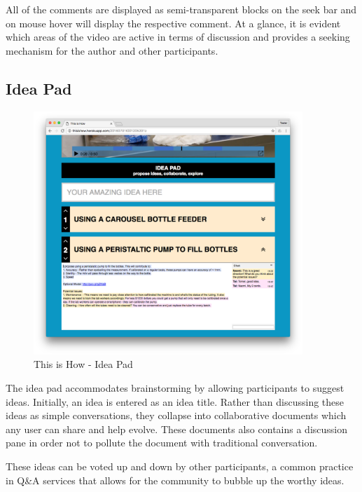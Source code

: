 
All of the comments are displayed as semi-transparent blocks on the seek bar and on mouse hover will display the respective comment. At a glance, it is evident which areas of the video are active in terms of discussion and provides a seeking mechanism for the author and other participants.  

\subsection{Idea Pad}

   \begin{figure}[thpb]
      \centering
      \includegraphics[width=4in]{figures/ideapad-collapsed.png}
      \caption{This is How - Idea Pad}
      \label{fig_comment_thread}
   \end{figure}

The idea pad accommodates brainstorming by allowing participants to suggest ideas. Initially, an idea is entered as an idea title. Rather than discussing these ideas as simple conversations, they collapse into collaborative documents which any user can share and help evolve. These documents also contains a discussion pane in order not to pollute the document with traditional conversation. 

These ideas can be voted up and down by other participants, a common practice in Q\&A services\cite{stackoverflow}\cite{quora} that allows for the community to bubble up the worthy ideas.   